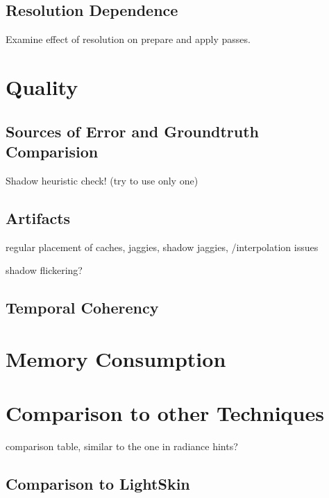 \documentclass[thesis.tex]{subfiles}
\begin{document}
\subsection{Resolution Dependence}
Examine effect of resolution on prepare and apply passes.


\newpage

\section{Quality}

\subsection{Sources of Error and Groundtruth Comparision}
Shadow heuristic check! (try to use only one)

\subsection{Artifacts}
regular placement of caches, jaggies,
shadow jaggies,
/interpolation issues

shadow flickering?

\subsection{Temporal Coherency}


\section{Memory Consumption}

\section{Comparison to other Techniques} \label{sec:eva:comparisiontoother}

comparison table, similar to the one in radiance hints?

\subsection{Comparison to LightSkin}

\subfilebib %
\end{document}
